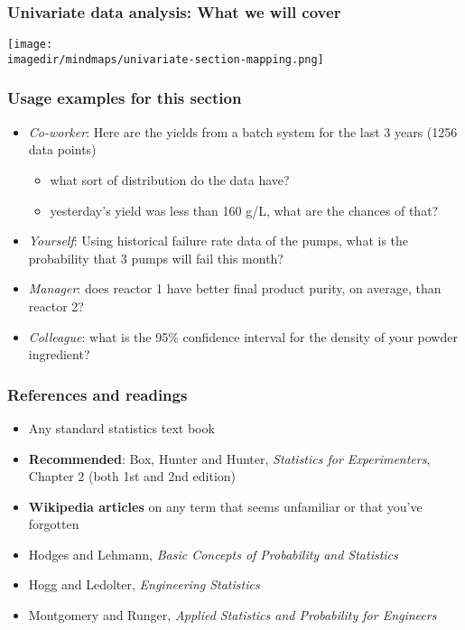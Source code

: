 \begin{frame}\frametitle{Univariate data analysis: What we will cover}
	\texttt{[image: \\imagedir/mindmaps/univariate-section-mapping.png]}
\end{frame}

\begin{frame}\frametitle{Usage examples for this section}
	\begin{itemize}
		\item	\emph{Co-worker}: Here are the yields from a batch system for the last 3 years (1256 data points)
		\begin{itemize}
			\item	what sort of distribution do the data have?
			\item	yesterday's yield was less than 160 g/L, what are the chances of that?
		\end{itemize}
		\item	\emph{Yourself}: Using historical failure rate data of the pumps, what is the probability that 3 pumps will fail this month?
		\item	\emph{Manager}: does reactor 1 have better final product purity, on average, than reactor 2?
		\item	\emph{Colleague}: what is the 95\% confidence interval for the density of your powder ingredient?
	\end{itemize}
\end{frame}

\begin{frame}\frametitle{References and readings}
	\begin{itemize}
		\item	Any standard statistics text book
		\item	\textbf{Recommended}: Box, Hunter and Hunter, \emph{Statistics for Experimenters}, Chapter 2 (both 1st and 2nd edition)
		\item	\textbf{Wikipedia articles} on any term that seems unfamiliar or that you've forgotten

		\vspace{2cm}
		\item	Hodges and Lehmann, \emph{Basic Concepts of Probability and Statistics}
		\item	Hogg and Ledolter, \emph{Engineering Statistics}
		\item	Montgomery and Runger, \emph{Applied Statistics and Probability for Engineers}
	\end{itemize}
\end{frame}


